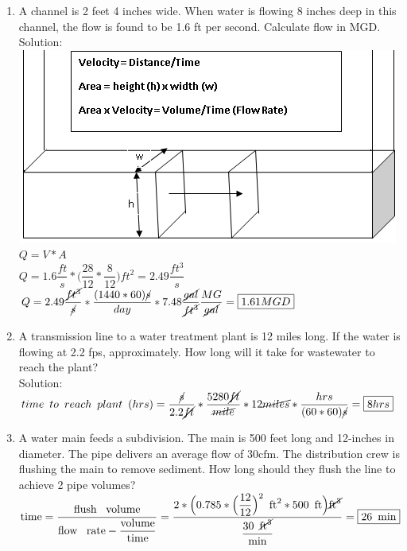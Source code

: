 \documentclass{article}
\begin{document}
\begin{enumerate}
\item A channel is 2 feet 4 inches wide. When water is flowing 8 inches deep in this channel, the flow is found to be 1.6 ft per second. Calculate flow in MGD.\\
\vspace{0.3cm}
Solution:\\
\vspace{0.3cm}
\includegraphics[scale=0.5]{ChannelFlow3}\\
$Q=V*A$\\
$Q=1.6\dfrac{ft}{s}*\Big(\dfrac{28}{12}*\dfrac{8}{12}\Big)ft^2=2.49\dfrac{ft^3}{s}$\\
$Q=2.49\dfrac{\cancel{ft^3}}{\cancel{s}}*\dfrac{(1440*60)\cancel{s}}{day}*7.48\dfrac{\cancel{gal}}{\cancel{ft^3}}\dfrac{MG}{\cancel{gal}}=\boxed{1.61MGD}$


\item A transmission line to a water treatment plant is 12 miles long. If the water is flowing at 2.2 fps, approximately.  How long will it take for wastewater to reach the plant?\\
Solution:\\
$time \enspace to \enspace reach \enspace plant \enspace (hrs)=\dfrac{\cancel{s}}{2.2\cancel{ft}}*\dfrac{5280\cancel{ft}}{\cancel{mile}}*12\cancel{miles}*\dfrac{hrs}{(60*60)\cancel{s}}=\boxed{8hrs}$ 


\item A water main feeds a subdivision. The main is 500 feet long and 12-inches in diameter. The pipe delivers an average flow of $30 \mathrm{cfm}$. The distribution crew is flushing the main to remove sediment. How long should they flush the line to achieve 2 pipe volumes?\\
\vspace{0.3cm}
$\textrm{time}=\dfrac{\textrm{flush \enspace volume}}{\textrm{flow \enspace rate} - \dfrac{\textrm{volume}}{\textrm{time}}}=\dfrac{2 * \Big(0.785*\Big(\dfrac{12}{12}\Big)^2 \enspace \textrm{ft}^2 *500 \enspace \textrm{ft}\Big)\cancel{\textrm{ft}^3}}{\dfrac{30 \enspace \cancel{\mathrm{ft}^3}}{\textrm{min}}}=\boxed{26 \enspace \textrm{min}} $
\vspace{0.3cm}


\end{enumerate}
\end{document}
